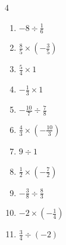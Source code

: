 \begin{multicols}{4}
\begin{enumerate}
  \item $\displaystyle -8\div{}\frac{1}{6}$

        \phantom{$\displaystyle =-48$}

\columnbreak %

  \item $\displaystyle \frac{8}{5}\times{}\left(-\frac{3}{5}\right)$


  \item $\displaystyle \frac{5}{4}\times{}1$


  \item $\displaystyle -\frac{1}{3}\times{}1$


  \item $\displaystyle -\frac{10}{7}\div{}\frac{7}{8}$


  \item $\displaystyle \frac{4}{3}\times{}\left(-\frac{10}{3}\right)$


  \item $\displaystyle 9\div{}1$

        \phantom{$\displaystyle =9$}

  \item $\displaystyle \frac{1}{2}\times{}\left(-\frac{7}{2}\right)$


  \item $\displaystyle -\frac{3}{8}\div{}\frac{8}{3}$


  \item $\displaystyle -2\times{}\left(-\frac{1}{4}\right)$


  \item $\displaystyle \frac{3}{4}\div{}\left(-2\right)$


\columnbreak %

\resetques


\end{enumerate}
\end{multicols}
